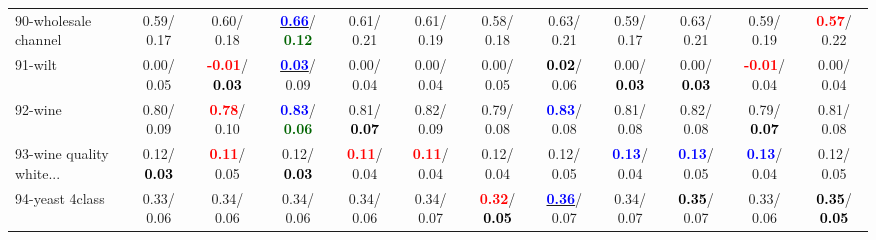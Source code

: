 \begin{table}[h]
\begin{center}
{\begin{tabular}{lc|c|c|c|c|c|c|c|c|c|c}
90-wholesale channel &   0.59/  0.17 &   0.60/  0.18 & \underline{\textcolor{blue}{\textbf{  0.66}}}/\textcolor{darkgreen}{\textbf{  0.12}} &   0.61/  0.21 &   0.61/  0.19 &   0.58/  0.18 &   0.63/  0.21 &   0.59/  0.17 &   0.63/  0.21 &   0.59/  0.19 & \textcolor{red}{\textbf{  0.57}}/  0.22 \\
91-wilt &   0.00/  0.05 & \textcolor{red}{\textbf{ -0.01}}/\textcolor{black}{\textbf{  0.03}} & \underline{\textcolor{blue}{\textbf{  0.03}}}/  0.09 &   0.00/  0.04 &   0.00/  0.04 &   0.00/  0.05 & \textcolor{black}{\textbf{  0.02}}/  0.06 &   0.00/\textcolor{black}{\textbf{  0.03}} &   0.00/\textcolor{black}{\textbf{  0.03}} & \textcolor{red}{\textbf{ -0.01}}/  0.04 &   0.00/  0.04 \\
92-wine &   0.80/  0.09 & \textcolor{red}{\textbf{  0.78}}/  0.10 & \textcolor{blue}{\textbf{  0.83}}/\textcolor{darkgreen}{\textbf{  0.06}} &   0.81/\textcolor{black}{\textbf{  0.07}} &   0.82/  0.09 &   0.79/  0.08 & \textcolor{blue}{\textbf{  0.83}}/  0.08 &   0.81/  0.08 &   0.82/  0.08 &   0.79/\textcolor{black}{\textbf{  0.07}} &   0.81/  0.08 \\ \hline
93-wine quality white... &   0.12/\textcolor{black}{\textbf{  0.03}} & \textcolor{red}{\textbf{  0.11}}/  0.05 &   0.12/\textcolor{black}{\textbf{  0.03}} & \textcolor{red}{\textbf{  0.11}}/  0.04 & \textcolor{red}{\textbf{  0.11}}/  0.04 &   0.12/  0.04 &   0.12/  0.05 & \textcolor{blue}{\textbf{  0.13}}/  0.04 & \textcolor{blue}{\textbf{  0.13}}/  0.05 & \textcolor{blue}{\textbf{  0.13}}/  0.04 &   0.12/  0.05 \\
94-yeast 4class &   0.33/  0.06 &   0.34/  0.06 &   0.34/  0.06 &   0.34/  0.06 &   0.34/  0.07 & \textcolor{red}{\textbf{  0.32}}/\textcolor{black}{\textbf{  0.05}} & \underline{\textcolor{blue}{\textbf{  0.36}}}/  0.07 &   0.34/  0.07 & \textcolor{black}{\textbf{  0.35}}/  0.07 &   0.33/  0.06 & \textcolor{black}{\textbf{  0.35}}/\textcolor{black}{\textbf{  0.05}} \\\end{tabular}}\label{stratsALCKappa2aIELMRedux}
\end{center}
\end{table}